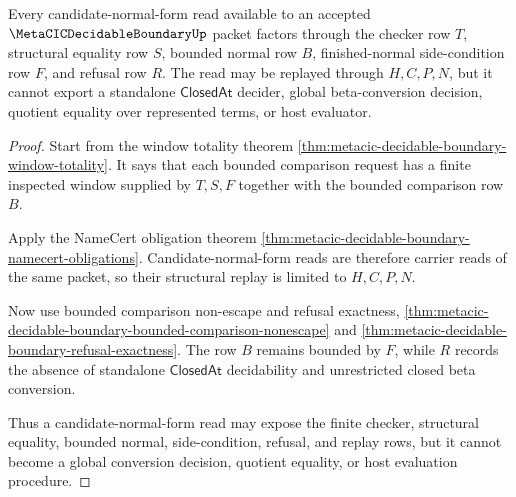 \begin{theorem}
\label{thm:metacic-decidable-boundary-candidate-normal-form}
Every candidate-normal-form read available to an accepted $\MetaCICDecidableBoundaryUp$ packet factors through the checker row $T$, structural equality row $S$, bounded normal row $B$, finished-normal side-condition row $F$, and refusal row $R$. The read may be replayed through $H,C,P,N$, but it cannot export a standalone $\mathsf{ClosedAt}$ decider, global beta-conversion decision, quotient equality over represented terms, or host evaluator.
\end{theorem}
\begin{proof}
Start from the window totality theorem \autoref{thm:metacic-decidable-boundary-window-totality}. It says that each bounded comparison request has a finite inspected window supplied by $T,S,F$ together with the bounded comparison row $B$.

Apply the NameCert obligation theorem \autoref{thm:metacic-decidable-boundary-namecert-obligations}. Candidate-normal-form reads are therefore carrier reads of the same packet, so their structural replay is limited to $H,C,P,N$.

Now use bounded comparison non-escape and refusal exactness, \autoref{thm:metacic-decidable-boundary-bounded-comparison-nonescape} and \autoref{thm:metacic-decidable-boundary-refusal-exactness}. The row $B$ remains bounded by $F$, while $R$ records the absence of standalone $\mathsf{ClosedAt}$ decidability and unrestricted closed beta conversion.

Thus a candidate-normal-form read may expose the finite checker, structural equality, bounded normal, side-condition, refusal, and replay rows, but it cannot become a global conversion decision, quotient equality, or host evaluation procedure.
\end{proof}

